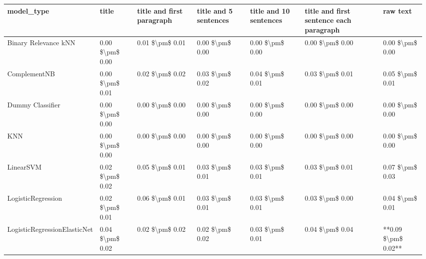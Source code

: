 \begin{tabular}{lllllll}
\toprule
                     model\_type &           title & title and first paragraph & title and 5 sentences & title and 10 sentences & title and first sentence each paragraph &            raw text \\
\midrule
           Binary Relevance kNN & 0.00 \$\textbackslash pm\$ 0.00 &           0.01 \$\textbackslash pm\$ 0.01 &       0.00 \$\textbackslash pm\$ 0.00 &        0.00 \$\textbackslash pm\$ 0.00 &                         0.00 \$\textbackslash pm\$ 0.00 &     0.00 \$\textbackslash pm\$ 0.00 \\
                   ComplementNB & 0.00 \$\textbackslash pm\$ 0.01 &           0.02 \$\textbackslash pm\$ 0.02 &       0.03 \$\textbackslash pm\$ 0.02 &        0.04 \$\textbackslash pm\$ 0.01 &                         0.03 \$\textbackslash pm\$ 0.01 &     0.05 \$\textbackslash pm\$ 0.01 \\
               Dummy Classifier & 0.00 \$\textbackslash pm\$ 0.00 &           0.00 \$\textbackslash pm\$ 0.00 &       0.00 \$\textbackslash pm\$ 0.00 &        0.00 \$\textbackslash pm\$ 0.00 &                         0.00 \$\textbackslash pm\$ 0.00 &     0.00 \$\textbackslash pm\$ 0.00 \\
                            KNN & 0.00 \$\textbackslash pm\$ 0.00 &           0.00 \$\textbackslash pm\$ 0.00 &       0.00 \$\textbackslash pm\$ 0.00 &        0.00 \$\textbackslash pm\$ 0.00 &                         0.00 \$\textbackslash pm\$ 0.00 &     0.00 \$\textbackslash pm\$ 0.00 \\
                      LinearSVM & 0.02 \$\textbackslash pm\$ 0.02 &           0.05 \$\textbackslash pm\$ 0.01 &       0.03 \$\textbackslash pm\$ 0.01 &        0.03 \$\textbackslash pm\$ 0.01 &                         0.03 \$\textbackslash pm\$ 0.01 &     0.07 \$\textbackslash pm\$ 0.03 \\
             LogisticRegression & 0.02 \$\textbackslash pm\$ 0.01 &           0.06 \$\textbackslash pm\$ 0.01 &       0.03 \$\textbackslash pm\$ 0.01 &        0.03 \$\textbackslash pm\$ 0.01 &                         0.03 \$\textbackslash pm\$ 0.00 &     0.04 \$\textbackslash pm\$ 0.01 \\
   LogisticRegressionElasticNet & 0.04 \$\textbackslash pm\$ 0.02 &           0.02 \$\textbackslash pm\$ 0.02 &       0.02 \$\textbackslash pm\$ 0.02 &        0.03 \$\textbackslash pm\$ 0.01 &                         0.04 \$\textbackslash pm\$ 0.04 & **0.09 \$\textbackslash pm\$ 0.02** \\

\end{tabular}
